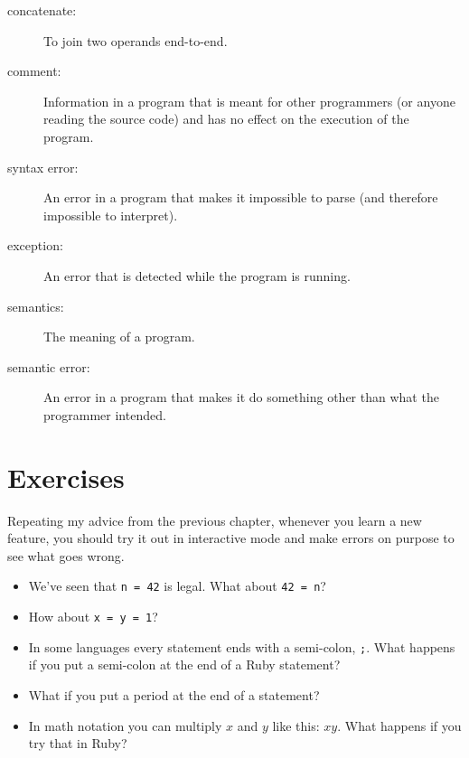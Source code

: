 \documentclass[10pt]{book}
\begin{document}
\begin{description}
\item[concatenate:]  To join two operands end-to-end.

\item[comment:]  Information in a program that is meant for other
programmers (or anyone reading the source code) and has no effect on the
execution of the program.

\item[syntax error:]  An error in a program that makes it impossible
to parse (and therefore impossible to interpret).

\item[exception:]  An error that is detected while the program is running.

\item[semantics:]  The meaning of a program.

\item[semantic error:]   An error in a program that makes it do something
other than what the programmer intended.

\end{description}


\section{Exercises}

\begin{exercise}

Repeating my advice from the previous chapter, whenever you learn
a new feature, you should try it out in interactive mode and make
errors on purpose to see what goes wrong.

\begin{itemize}

\item We've seen that {\tt n = 42} is legal.  What about {\tt 42 = n}?

\item How about {\tt x = y = 1}?

\item In some languages every statement ends with a semi-colon, {\tt ;}.
What happens if you put a semi-colon at the end of a Ruby statement?

\item What if you put a period at the end of a statement?

\item In math notation you can multiply $x$ and $y$ like this: $x y$.
What happens if you try that in Ruby?

\end{itemize}

\end{exercise}
\end{document}
